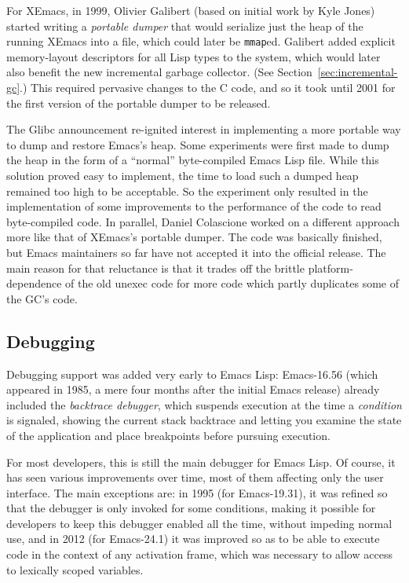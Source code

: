 \documentclass[format=acmsmall, review]{acmart}
\newcommand \Elisp {Emacs Lisp}
\begin{document}
For XEmacs, in 1999, Olivier Galibert (based on initial work by Kyle
Jones) started writing a \emph{portable dumper} that would serialize
just the heap of the running XEmacs into a file, which could later be
\texttt{mmap}ed.  Galibert added explicit memory-layout descriptors
for all Lisp types to the system, which would later also benefit the
new incremental garbage collector.  (See
Section~\ref{sec:incremental-gc}.)  This required pervasive changes to
the C code, and so it took until 2001 for the first version of the
portable dumper to be released.

The Glibc announcement re-ignited interest in implementing a more portable
way to dump and restore Emacs's heap.  Some experiments were first made to dump
the heap in the form of a ``normal'' byte-compiled \Elisp{} file.
While this solution proved easy to implement, the time to load such a dumped
heap remained too high to be acceptable.  So the experiment only resulted in
the implementation of some improvements to the performance of the code to
read byte-compiled code.  In parallel, Daniel Colascione worked on
a different approach more like that of XEmacs's portable dumper.  The code
was basically finished, but Emacs maintainers so far have not accepted it
into the official release.  The main reason for that reluctance is that it
trades off the brittle platform-dependence of the old unexec code for more
code which partly duplicates some of the GC's code.

\subsection{Debugging}
\label{sec:debugger}

Debugging support was added very early to \Elisp: Emacs-16.56 (which
appeared in 1985, a mere four months after the initial Emacs release) already
included the \emph{backtrace debugger}, which suspends execution at the time
a \emph{condition} is signaled, showing the current stack backtrace and
letting you examine the state of the application and place breakpoints
before pursuing execution.

For most developers, this is still the main debugger for \Elisp{}.
Of course, it has seen various improvements over time, most of them
affecting only the user interface.  The main exceptions are:
in 1995 (for Emacs-19.31), it was refined so that the debugger is only
invoked for some conditions, making it possible for developers to keep this
debugger enabled all the time, without impeding normal use, and in 2012
(for Emacs-24.1) it was improved so as to be able to execute code in the
context of any activation frame, which was necessary to allow access to
lexically scoped variables.
\end{document}
